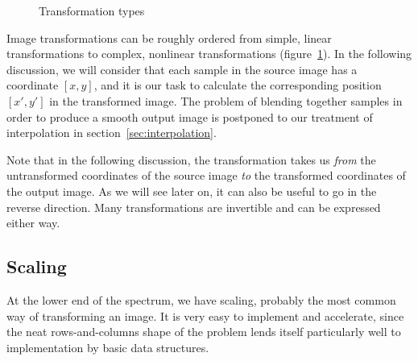 \documentclass[english,12pt]{ifimaster}
\begin{document}
\begin{figure}
  \centering
  \qquad{}

  \qquad{}


  \caption{Transformation types}
  \label{fig:transformations}
\end{figure}

Image transformations can be roughly ordered from simple, linear
transformations to complex, nonlinear transformations
(figure~\ref{fig:transformations}). In the following discussion, we
will consider that each sample in the source image has a coordinate
$[x, y]$, and it is our task to calculate the corresponding position
$[x', y']$ in the transformed image. The problem of blending together
samples in order to produce a smooth output image is postponed to our
treatment of interpolation in section~\ref{sec:interpolation}.

Note that in the following discussion, the transformation takes us
\emph{from} the untransformed coordinates of the source image
\emph{to} the transformed coordinates of the output image. As we will
see later on, it can also be useful to go in the reverse direction.
Many transformations are invertible and can be expressed either way.

\subsection{Scaling}

At the lower end of the spectrum, we have scaling, probably the most
common way of transforming an image. It is very easy to implement and
accelerate, since the neat rows-and-columns shape of the problem lends
itself particularly well to implementation by basic data structures.
\end{document}
